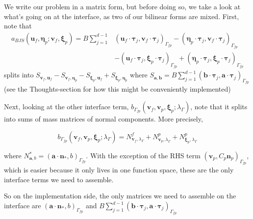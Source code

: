 \documentclass{article}
\newcommand{\mathspace}[1]{\ensuremath{#1}\xspace} %
\newcommand{\inner}[2]{\mathspace{\left (#1, #2 \right)}}
\newcommand{\taubf}{\mathspace{\boldsymbol{\tau}}}
\newcommand{\interface}{\mathspace{\Gamma_{fp}}}
\newcommand{\np}{\mathspace{\mathbf{n}_p}}
\newcommand{\nporf}{\mathspace{\mathbf{n}_*}}
\newcommand{\uf}{\mathspace{\mathbf{u}_f}}
\newcommand{\vf}{\mathspace{\mathbf{v}_f}}
\newcommand{\vp}{\mathspace{\mathbf{v}_p}}
\newcommand{\disp}{\mathspace{\boldsymbol{\eta}_p}}
\newcommand{\disptest}{\mathspace{\boldsymbol{\xi}_p}}
\newcommand{\mult}{\mathspace{\lambda_{\Gamma}}}
\begin{document}
We write our problem in a matrix form, but before doing so, we take a look at what's going on at the interface, as two of our bilinear forms are mixed. First, note that
\begin{align*}
a_{BJS}(\uf, \disp; \vf, \disptest) = B \sum_{j=1}^{d-1} & \inner{\uf \cdot \taubf_j}{\vf \cdot \taubf_j}_{\interface} - \inner{\disp \cdot \taubf_j}{\vf \cdot \taubf_j}_{\interface} \\
                                                         & - \inner{\uf \cdot \taubf_j}{\disptest \cdot \taubf_j}_{\interface}+ \inner{\disp \cdot \taubf_j}{\disptest \cdot \taubf_j}_{\interface}
\end{align*}
splits into $S_{\vf, \uf} - S_{\vf, \disp} - S_{\disptest, \uf} + S_{\disptest, \disp}$
where $S_{\mathbf{a}, \mathbf{b}} = B \sum_{j=1}^{d-1} \inner{\mathbf{b} \cdot \taubf_j}{\mathbf{a} \cdot \taubf_j}_{\interface}$ (see the Thoughts-section for how this might be conveniently implemented)

Next, looking at the other interface term, $b_{\interface}(\vf, \vp, \disptest; \mult)$, note that it splits into sums of mass matrices of normal components. More precisely,

$$b_{\interface}(\vf, \vp, \disptest; \mult) = N^f_{\vf, \mult} + N^p_{\vp, \mult} + N^p_{\disptest, \mult} $$

where $N^*_{\mathbf{a}, b} = \inner{\mathbf{a} \cdot \nporf}{b}_{\interface}$. With the exception of the RHS term $\inner{\vp}{C_p\np}_{\interface}$, which is easier because it only lives in one function space, these are the only interface terms we need to assemble.

So on the implementation side, the only matrices we need to assemble on the interface are $\inner{\mathbf{a} \cdot \nporf}{b}_{\interface}$ and  $B \sum_{j=1}^{d-1} \inner{\mathbf{b} \cdot \taubf_j}{\mathbf{a} \cdot \taubf_j}_{\interface}$
\end{document}
